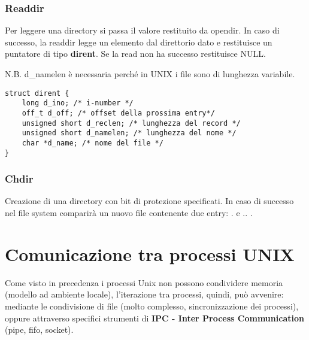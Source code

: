 \documentclass{article}
\begin{document}
\subsubsection{Readdir}

\noindent {} 
\medskip

\noindent Per leggere una directory si passa il valore restituito da opendir. In caso di successo, la readdir legge un elemento 
dal direttorio dato e restituisce un puntatore di tipo \textbf{dirent}. Se la read non ha successo restituisce NULL.

N.B. d\_namelen è necessaria perché in UNIX i file sono di lunghezza variabile.
\begin{lstlisting}[style=CStyle]
struct dirent {
    long d_ino; /* i-number */
    off_t d_off; /* offset della prossima entry*/
    unsigned short d_reclen; /* lunghezza del record */
    unsigned short d_namelen; /* lunghezza del nome */
    char *d_name; /* nome del file */
}    
\end{lstlisting}



\subsubsection{Chdir}
\noindent {} 
\medskip

Creazione di una directory con bit di protezione specificati. In caso di successo nel file system comparirà un nuovo file contenente 
due entry: . e .. .


\pagebreak

\section{Comunicazione tra processi UNIX}
\noindent Come visto in precedenza i processi Unix non 
possono condividere memoria (modello ad ambiente locale),
l'iterazione tra processi, quindi, può avvenire:
 mediante le condivisione di file (molto complesso,
sincronizzazione dei processi), oppure attraverso specifici
strumenti di \textbf{IPC - Inter Process Communication}
(pipe, fifo, socket).
\end{document}
